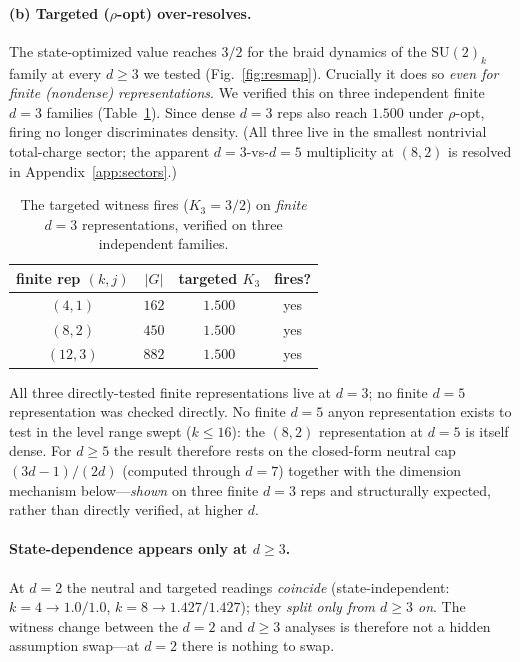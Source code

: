 \documentclass[aps,prx,reprint,amsmath,amssymb,floatfix,nofootinbib,superscriptaddress]{revtex4-2}
\begin{document}
\paragraph{(b) Targeted ($\rho$-opt) over-resolves.}
The state-optimized value reaches $3/2$ for the braid dynamics of the $\mathrm{SU}(2)_k$ family at every $d \ge 3$ we tested (Fig.~\ref{fig:resmap}). Crucially it does so \emph{even for finite (nondense) representations}. We
verified this on three independent finite $d=3$ families (Table~\ref{tab:finite}).
Since dense $d=3$ reps also reach $1.500$ under $\rho$-opt, firing no longer
discriminates density. (All three live in the smallest nontrivial total-charge
sector; the apparent $d=3$-vs-$d=5$ multiplicity at $(8,2)$ is resolved in
Appendix~\ref{app:sectors}.)

\begin{table}[b]
\caption{The targeted witness fires ($K_3 = 3/2$) on \emph{finite} $d=3$
representations, verified on three independent families.}
\label{tab:finite}
\centering
\begin{tabular}{c c c c}
\toprule
finite rep $(k,j)$ & $|G|$ & targeted $K_3$ & fires? \\
\midrule
$(4,1)$  & $162$ & $1.500$ & yes \\
$(8,2)$  & $450$ & $1.500$ & yes \\
$(12,3)$ & $882$ & $1.500$ & yes \\
\bottomrule
\end{tabular}
\end{table}

All three directly-tested finite representations live at $d=3$; no finite $d=5$
representation was checked directly. No finite $d=5$ anyon representation exists to
test in the level range swept ($k \le 16$): the $(8,2)$ representation at $d=5$ is
itself dense. For $d \ge 5$ the result therefore rests on the closed-form neutral
cap $(3d-1)/(2d)$ (computed through $d=7$) together with the dimension mechanism
below---\emph{shown} on three finite $d=3$ reps and structurally expected, rather
than directly verified, at higher $d$.

\paragraph{State-dependence appears only at $d \ge 3$.}
At $d=2$ the neutral and targeted readings \emph{coincide} (state-independent:
$k=4 \to 1.0/1.0$, $k=8 \to 1.427/1.427$); they \emph{split only from $d \ge 3$ on}.
The witness change between the $d=2$ and $d \ge 3$ analyses is therefore not a hidden
assumption swap---at $d=2$ there is nothing to swap.
\end{document}
